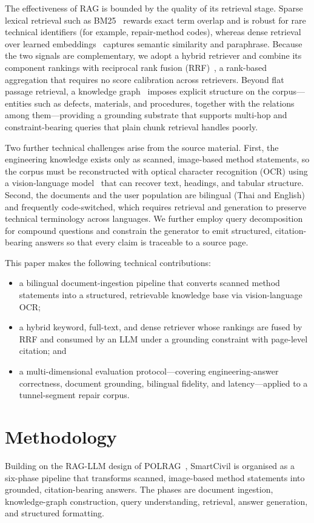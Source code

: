 \documentclass[10pt,a4paper,conference]{IEEEtran}
\begin{document}
The effectiveness of RAG is bounded by the quality of its retrieval stage.
Sparse lexical retrieval such as BM25~\cite{bm25} rewards exact term overlap and
is robust for rare technical identifiers (for example, repair-method codes),
whereas dense retrieval over learned embeddings~\cite{dpr} captures semantic
similarity and paraphrase. Because the two signals are complementary, we adopt a
hybrid retriever and combine its component rankings with reciprocal rank fusion
(RRF)~\cite{rrf}, a rank-based aggregation that requires no score calibration
across retrievers. Beyond flat passage retrieval, a knowledge
graph~\cite{graphrag} imposes explicit structure on
the corpus---entities such as defects, materials, and procedures, together with
the relations among them---providing a grounding substrate that supports
multi-hop and constraint-bearing queries that plain chunk retrieval handles
poorly.

Two further technical challenges arise from the source material. First, the
engineering knowledge exists only as scanned, image-based method statements, so
the corpus must be reconstructed with optical character recognition (OCR) using
a vision-language model~\cite{nougat} that can recover text, headings, and
tabular structure.
Second, the documents and the user population are bilingual (Thai and English)
and frequently code-switched, which requires retrieval and generation to
preserve technical terminology across languages. We further employ query
decomposition for compound questions and constrain the generator to emit
structured, citation-bearing answers so that every claim is traceable to a
source page.

This paper makes the following technical contributions:
\begin{itemize}
\item a bilingual document-ingestion pipeline that converts scanned
method statements into a structured, retrievable knowledge base via
vision-language OCR;
\item a hybrid keyword, full-text, and dense retriever whose rankings are fused
by RRF and consumed by an LLM under a grounding constraint with page-level
citation; and
\item a multi-dimensional evaluation protocol---covering engineering-answer
correctness, document grounding, bilingual fidelity, and latency---applied to a
tunnel-segment repair corpus.
\end{itemize}

\section{Methodology}
Building on the RAG-LLM design of POLRAG~\cite{polrag}, SmartCivil is organised
as a six-phase pipeline that transforms scanned, image-based method statements
into grounded, citation-bearing answers. The
phases are document ingestion, knowledge-graph construction, query
understanding, retrieval, answer generation, and structured formatting.
\end{document}
